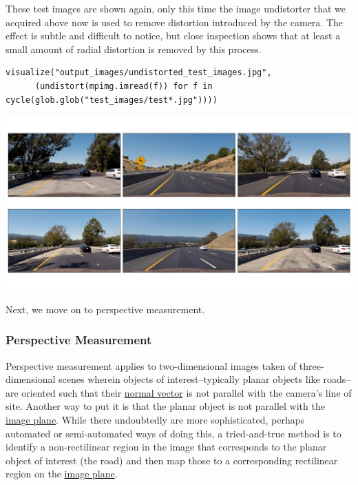 \documentclass[11pt]{article}
\begin{document}
These test images are shown again, only this time the image
undistorter that we acquired above now is used to remove
distortion introduced by the camera.  The effect is subtle and
difficult to notice, but close inspection shows that at least a
small amount of radial distortion is removed by this process.  

\begin{verbatim}
visualize("output_images/undistorted_test_images.jpg",
	  (undistort(mpimg.imread(f)) for f in cycle(glob.glob("test_images/test*.jpg"))))
\end{verbatim}

\includegraphics[width=.9\linewidth]{output_images/undistorted_test_images.jpg}

Next, we move on to perspective measurement.

\subsubsection*{Perspective Measurement}
\label{sec-2-2-3}

Perspective measurement applies to two-dimensional images taken
of three-dimensional scenes wherein objects of
interest--typically planar objects like roads--are oriented such
that their \href{http://mathworld.wolfram.com/NormalVector.html}{normal vector} is not parallel with the camera's line
of site.  Another way to put it is that the planar object is not
parallel with the \href{https://en.wikipedia.org/wiki/Image_plane}{image plane}.  While there undoubtedly are more
sophisticated, perhaps automated or semi-automated ways of doing
this, a tried-and-true method is to identify a non-rectilinear
region in the image that corresponds to the planar object of
interest (the road) and then map those to a corresponding
rectilinear region on the \href{https://en.wikipedia.org/wiki/Image_plane}{image plane}.  
\end{document}

